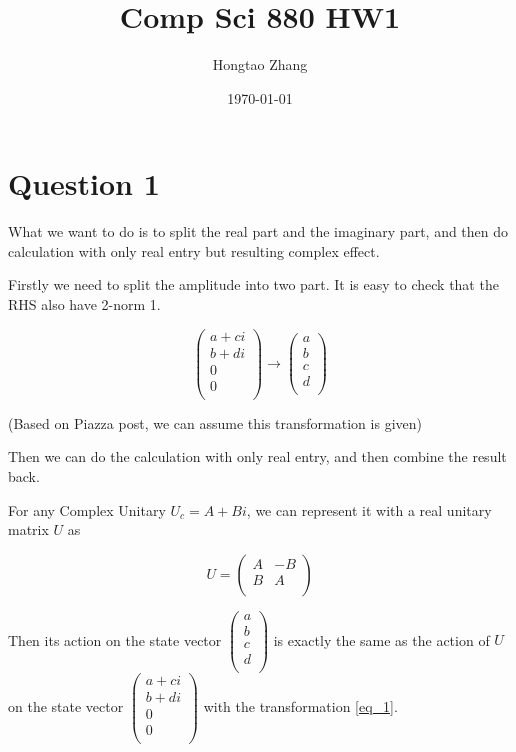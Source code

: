 \documentclass{article}
\author{Hongtao Zhang}
\date{\today}
\title{Comp Sci 880 HW1}
\theoremstyle{definition}
\begin{document}
\maketitle

{
  \hypersetup{linkcolor=black}
  \tableofcontents
}




\pagebreak
\section{Question 1}

What we want to do is to split the real part and the imaginary part, and then do calculation with only real entry
but resulting complex effect.

Firstly we need to split the amplitude into two part. It is easy to check that the RHS also have 2-norm 1.

\begin{equation}\label{eq_1}
  \begin{pmatrix}
    a+ci \\
    b+di \\
    0    \\
    0    \\
  \end{pmatrix} \to
  \begin{pmatrix}
    a \\
    b \\
    c \\
    d \\
  \end{pmatrix}
\end{equation}

(Based on Piazza post, we can assume this transformation is given)

Then we can do the calculation with only real entry, and then combine the result back.

For any Complex Unitary $U_c= A+Bi$, we can represent it with a real unitary matrix $U$ as

\[
  U = \begin{pmatrix}
    A & -B \\
    B & A  \\
  \end{pmatrix}
\]

Then its action on the state vector $
  \begin{pmatrix}
    a \\
    b \\
    c \\
    d \\
  \end{pmatrix}$ is exactly the same as the action of $U$ on the state vector $
  \begin{pmatrix}
    a + ci \\
    b + di \\
    0      \\
    0      \\
  \end{pmatrix}$ with the transformation \eqref{eq_1}.
\end{document}
